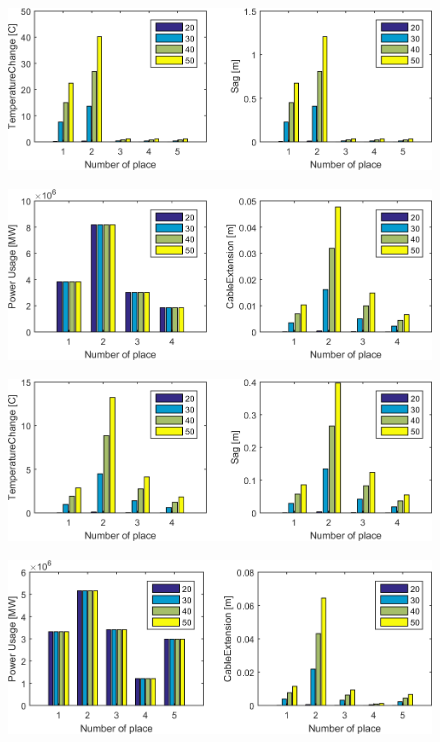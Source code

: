 \documentclass[a4paper]{article}
\begin{document}
\clearpage

\begin{figure}[!h]
\centering
\includegraphics[scale=0.44]{schemas/img5_2.png}
\label{fig:img5_2}
\end{figure}

\begin{figure}[!h]
\centering
\includegraphics[scale=0.44]{schemas/img6_1.png}
\label{fig:img6_1}
\end{figure}

\begin{figure}[!h]
\centering
\includegraphics[scale=0.44]{schemas/img6_2.png}
\label{fig:img6_2}
\end{figure}

\clearpage

\begin{figure}[!h]
\centering
\includegraphics[scale=0.44]{schemas/img7_1.png}
\label{fig:img7_1}
\end{figure}
\end{document}
